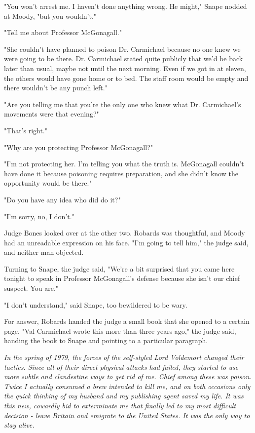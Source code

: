 \documentclass[a4paper,11pt]{article}
\begin{document}
"You won't arrest me. I haven't done anything wrong. He might," Snape nodded at Moody, "but you wouldn't."

"Tell me about Professor McGonagall."

"She couldn't have planned to poison Dr. Carmichael because no one knew we were going to be there. Dr. Carmichael stated quite publicly that we'd be back later than usual, maybe not until the next morning. Even if we got in at eleven, the others would have gone home or to bed. The staff room would be empty and there wouldn't be any punch left."

"Are you telling me that you're the only one who knew what Dr. Carmichael's movements were that evening?"

"That's right."

"Why are you protecting Professor McGonagall?"

"I'm not protecting her. I'm telling you what the truth is. McGonagall couldn't have done it because poisoning requires preparation, and she didn't know the opportunity would be there."

"Do you have any idea who did do it?"

"I'm sorry, no, I don't."

Judge Bones looked over at the other two. Robards was thoughtful, and Moody had an unreadable expression on his face. "I'm going to tell him," the judge said, and neither man objected.

Turning to Snape, the judge said, "We're a bit surprised that you came here tonight to speak in Professor McGonagall's defense because she isn't our chief suspect. You are."

"I don't understand," said Snape, too bewildered to be wary.

For answer, Robards handed the judge a small book that she opened to a certain page. "Val Carmichael wrote this more than three years ago," the judge said, handing the book to Snape and pointing to a particular paragraph.

\emph{In the spring of 1979, the forces of the self-styled Lord Voldemort changed their tactics. Since all of their direct physical attacks had failed, they started to use more subtle and clandestine ways to get rid of me. Chief among these was poison. Twice I actually consumed a brew intended to kill me, and on both occasions only the quick thinking of my husband and my publishing agent saved my life. It was this new, cowardly bid to exterminate me that finally led to my most difficult decision - leave Britain and emigrate to the United States. It was the only way to stay alive.}
\end{document}
